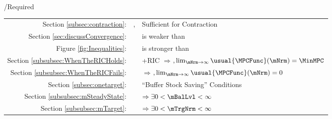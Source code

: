 \documentclass[\econtexRoot/BufferStockTheory]{subfiles}
\begin{document}
\begin{verbatimwrite}{\TableDir/Required}
\begin{table}
{\begin{tabular}{|l|l|l|}
  \\ \cline{2-3}\multicolumn{1}{|r|}{Section \ref{subsec:contraction}:}                            & \FVAC, \WRIC                      & Sufficient for Contraction
 \\ \multicolumn{1}{|r|}{Section \ref{sec:discussConvergence}:}                               &                      & \WRIC is weaker than \RIC 
\\  \multicolumn{1}{|r|}{Figure \ref{fig:Inequalities}:}                                        &                                 & \FVAC is stronger than \PFFVAC 
  \\ \multicolumn{1}{|r|}{Section \ref{subsubsec:WhenTheRICHolds}:}
                                            &                                 & \cncl{\FHWC}+RIC $\Rightarrow $\GICRaw$, \lim_{\mNrm \rightarrow \infty} \usual{\MPCFunc}(\mNrm)=\MinMPC$
  \\  \multicolumn{1}{|r|}{Section \ref{subsubsec:WhenTheRICFails}:}                                        &                                 & \cncl{\RIC}  $\Rightarrow $\cncl{\FHWC}$, \lim_{\mNrm \rightarrow \infty} \usual{\MPCFunc}(\mNrm)=0$
  \\ \cline{3-3}\multicolumn{1}{|r|}{Section \ref{subsec:onetarget}:}                                        &                                 & ``Buffer Stock Saving'' Conditions
  \\ \multicolumn{1}{|r|}{Section \ref{subsubsec:mSteadyState}:}                                        &                                 & \phantom{-Nrm}{\GICRaw} $\Rightarrow \exists 0 < \mBalLvl < \infty$ %
  \\ \multicolumn{1}{|r|}{Section \ref{subsubsec:mTarget}:}                                        &                                 & {\GICNrm} $\Rightarrow \exists 0 < \mTrgNrm < \infty$ %
                                                                                  

\end{tabular}}
\end{table}
\end{verbatimwrite}
\end{document}
